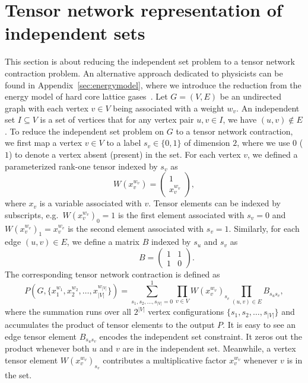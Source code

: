 \documentclass[onefignum, onetabnum]{siamart190516}
\newcommand{\<}{\langle}
\renewcommand{\>}{\rangle}
\newcommand{\App}[1]{Appendix~\ref{#1}}
\begin{document}
\section{Tensor network representation of independent sets} \label{sec:tnmap}
This section is about reducing the independent set problem to a tensor network contraction problem.
An alternative approach dedicated to physicists can be found in \App{sec:energymodel}, where we introduce the reduction from the energy model of hard core lattice gases~\cite{Dyre2016, Fernandes2007}.
Let $G=(V,E)$ be an undirected graph with each vertex $v\in V$ being associated with a weight $w_v$.
An independent set $I \subseteq V$ is a set of vertices that for any vertex pair $u,v \in I$, we have $(u, v) \not\in E$.
To reduce the independent set problem on $G$ to a tensor network contraction, we first map a vertex $v\in V$ to a label $s_v \in \{0, 1\}$ of dimension $2$, where we use $0$ ($1$) to denote a vertex absent (present) in the set.
For each vertex $v$, we defined a parameterized rank-one tensor indexed by $s_v$ as
\begin{equation}
    W(x_v^{w_v}) = \left(\begin{matrix}
        1 \\
        x_v^{w_v}
    \end{matrix}\right),\label{eq:vertextensor}
\end{equation}
where $x_v$ is a variable associated with $v$.
Tensor elements can be indexed by subscripts, e.g.\ $W(x_v^{w_v})_0=1$ is the first element associated with $s_v=0$ and $W(x_v^{w_v})_1=x_v^{w_v}$ is the second element associated with $s_v=1$.
Similarly, for each edge $(u, v) \in E$, we define a matrix $B$ indexed by $s_u$ and $s_v$ as
\begin{equation}
    \qquad \quad 
       B = \left(\begin{matrix}
        1  & 1\\
        1 & 0
    \end{matrix}\right). \label{eq:edgetensor}
\end{equation}
The corresponding tensor network contraction is defined as
\begin{equation}\label{eq:idp}
    P(G, \{x_1^{w_1}, x_{2}^{w_2}, \ldots,x_{|V|}^{w_{|V|}}\}) = \sum\limits_{s_1, s_2, \ldots, s_{|V|} = 0}^{1} \prod\limits_{v\in V} W(x_v^{w_v})_{s_v} \prod\limits_{(u,v) \in E} B_{s_u s_v},
\end{equation}
where the summation runs over all $2^{|V|}$ vertex configurations $\{s_1, s_{2}, \ldots,s_{|V|}\}$ and accumulates the product of tensor elements to the output $P$.
It is easy to see an edge tensor element $B_{s_us_v}$ encodes the independent set constraint. It zeros out the product whenever both $u$ and $v$ are in the independent set.
Meanwhile, a vertex tensor element $W(x_v^{w_v})_{s_v}$ contributes a multiplicative factor $x_v^{w_v}$ whenever $v$ is in the set.
\end{document}

